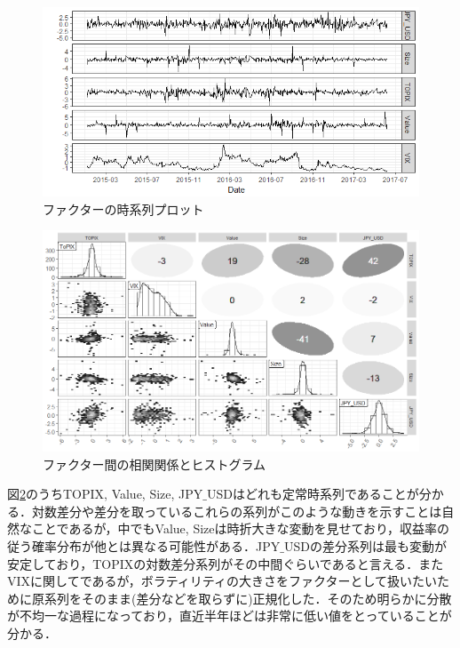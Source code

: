 ﻿\documentclass[11pt]{jreport}
\begin{document}
\begin{figure}[H]
	\begin{center}
		\includegraphics[width=15cm]{./fig/factor_plot.png}
		\caption{ファクターの時系列プロット}
		\label{fig:factor_plot}
	\end{center}
\end{figure}

\begin{figure}[H]
	\begin{center}
		\includegraphics[width=15cm]{./fig/factor_cor.png}
		\caption{ファクター間の相関関係とヒストグラム}
		\label{fig:factor_cor}
	\end{center}
\end{figure}

図\ref{fig:factor_cor}のうちTOPIX, Value, Size, JPY$\_$USDはどれも定常時系列であることが分かる．対数差分や差分を取っているこれらの系列がこのような動きを示すことは自然なことであるが，中でもValue, Sizeは時折大きな変動を見せており，収益率の従う確率分布が他とは異なる可能性がある．JPY$\_$USDの差分系列は最も変動が安定しており，TOPIXの対数差分系列がその中間ぐらいであると言える．またVIXに関してであるが，ボラティリティの大きさをファクターとして扱いたいために原系列をそのまま(差分などを取らずに)正規化した．そのため明らかに分散が不均一な過程になっており，直近半年ほどは非常に低い値をとっていることが分かる．
\end{document}
